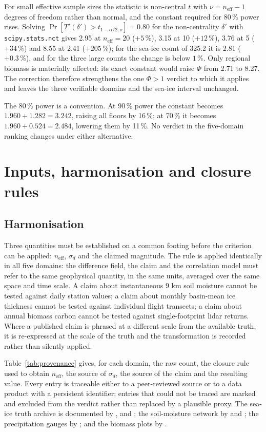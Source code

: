 \documentclass[preprint,12pt,authoryear]{elsarticle}
\begin{document}
For small effective sample sizes the statistic is non-central $t$ with $\nu = n_{\mathrm{eff}}-1$ degrees of freedom rather than normal, and the constant required for 80\,\% power rises. Solving $\Pr[T'(\delta') > t_{1-\alpha/2,\nu}] = 0.80$ for the non-centrality $\delta'$ with \texttt{scipy.stats.nct} gives 2.95 at $n_{\mathrm{eff}} = 20$ ($+5\,\%$), 3.15 at 10 ($+12\,\%$), 3.76 at 5 ($+34\,\%$) and 8.55 at 2.41 ($+205\,\%$); for the sea-ice count of 325.2 it is 2.81 ($+0.3\,\%$), and for the three large counts the change is below $1\,\%$. Only regional biomass is materially affected: its exact constant would raise $\Phi$ from 2.71 to 8.27. The correction therefore strengthens the one $\Phi>1$ verdict to which it applies and leaves the three verifiable domains and the sea-ice interval unchanged.

The 80\,\% power is a convention. At 90\,\% power the constant becomes $1.960+1.282 = 3.242$, raising all floors by 16\,\%; at 70\,\% it becomes $1.960+0.524 = 2.484$, lowering them by 11\,\%. No verdict in the five-domain ranking changes under either alternative.

\section{Inputs, harmonisation and closure rules}
\label{sec:s2}

\subsection{Harmonisation}
\label{sec:s2a}

Three quantities must be established on a common footing before the criterion can be applied: $n_{\mathrm{eff}}$, $\sigma_d$ and the claimed magnitude. The rule is applied identically in all five domains: the difference field, the claim and the correlation model must refer to the same geophysical quantity, in the same units, averaged over the same space and time scale. A claim about instantaneous 9 km soil moisture cannot be tested against daily station values; a claim about monthly basin-mean ice thickness cannot be tested against individual flight transects; a claim about annual biomass carbon cannot be tested against single-footprint lidar returns. Where a published claim is phrased at a different scale from the available truth, it is re-expressed at the scale of the truth and the transformation is recorded rather than silently applied.

Table~\ref{tab:provenance} gives, for each domain, the raw count, the closure rule used to obtain $n_{\mathrm{eff}}$, the source of $\sigma_d$, the source of the claim and the resulting value. Every entry is traceable either to a peer-reviewed source or to a data product with a persistent identifier; entries that could not be traced are marked and excluded from the verdict rather than replaced by a plausible proxy. The sea-ice truth archive is documented by \citet{kurtz2013sea}, \citet{kurtz2011snow} and \citet{icebird_pangaea}; the soil-moisture network by \citet{dorigo2021international} and \citet{gruber2018sparse}; the precipitation gauges by \citet{gpcc_v2022}; and the biomass plots by \citet{duncanson2022aboveground}.
\end{document}
